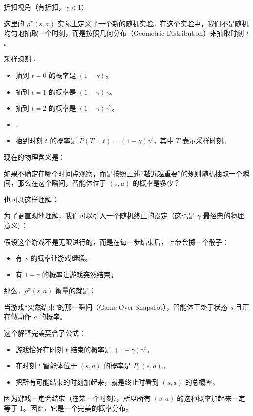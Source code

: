 折扣视角（有折扣，\(\gamma<1\)）

这里的 \(\rho^\pi(s,a)\) 实际上定义了一个新的随机实验。在这个实验中，我们不是随机均匀地抽取一个时刻，而是按照几何分布（Geometric Distribution）来抽取时刻 \(t\)。

采样规则：

\begin{itemize}
\tightlist
\item
  抽到 \(t=0\) 的概率是 \((1-\gamma)\)。
\item
  抽到 \(t=1\) 的概率是 \((1-\gamma)\gamma\)。
\item
  抽到 \(t=2\) 的概率是 \((1-\gamma)\gamma^2\)。
\item
  \ldots{}
\item
  抽到时刻 \(t\) 的概率是 \(P(T=t)=(1-\gamma)\gamma^t\)，其中 \(T\) 表示采样时刻。
\end{itemize}

现在的物理含义是：

如果不确定在哪个时间点观察，而是按照上述``越近越重要''的规则随机抽取一个瞬间，那么在这个瞬间，智能体位于 \((s,a)\) 的概率是多少？

也可以这样理解：

为了更直观地理解，我们可以引入一个随机终止的设定（这也是 \(\gamma\) 最经典的物理意义）：

假设这个游戏不是无限进行的，而是在每一步结束后，上帝会掷一个骰子：

\begin{itemize}
\tightlist
\item
  有 \(\gamma\) 的概率让游戏继续。
\item
  有 \(1-\gamma\) 的概率让游戏突然结束。
\end{itemize}

那么，\(\rho^\pi(s,a)\) 衡量的就是：

当游戏``突然结束''的那一瞬间（Game Over Snapshot），智能体正处于状态 \(s\) 且正在做动作 \(a\) 的概率。

这个解释完美契合了公式：

\begin{itemize}
\tightlist
\item
  游戏恰好在时刻 \(t\) 结束的概率是 \((1-\gamma)\gamma^t\)。
\item
  在时刻 \(t\) 智能体位于 \((s,a)\) 的概率是 \(P_t^\pi(s,a)\)。
\item
  把所有可能结束的时刻加起来，就是终止时看到 \((s,a)\) 的总概率。
\end{itemize}

因为游戏一定会结束（在某一个时刻），所以所有 \((s,a)\) 的这种概率加起来一定等于 1。因此，它是一个完美的概率分布。

